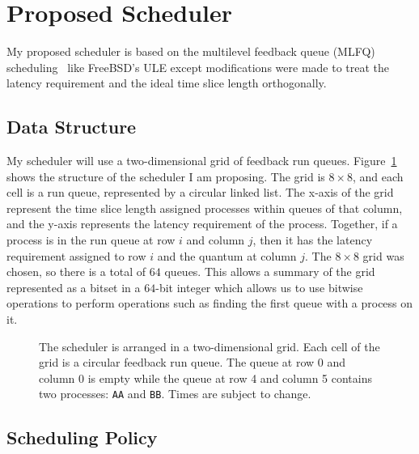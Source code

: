 \documentclass[letterpaper,twocolumn,10pt]{article}
\begin{document}
\section{Proposed Scheduler}

My proposed scheduler is based on the multilevel feedback queue (MLFQ) 
scheduling~\cite{mlfq} like FreeBSD's ULE except modifications were made 
to treat the latency requirement and the ideal time slice length orthogonally.

\subsection{Data Structure}

My scheduler will use a two-dimensional grid of feedback run queues. 
Figure~\ref{fig:mlfq_grid} shows the structure of the scheduler I am proposing. 
The grid is \(8\times 8\), and each cell is a run queue, represented by a 
circular linked list. The x-axis of the grid represent the time slice length 
assigned processes within queues of that column, and the y-axis represents the 
latency requirement of the process. Together, if a process is in the run 
queue at row \(i\) and column \(j\), then it has the latency requirement assigned 
to row \(i\) and the quantum at column \(j\). The \(8\times 8\) grid was chosen, 
so there is a total of \(64\) queues. This allows a summary of the grid represented 
as a bitset in a \(64\)-bit integer which allows us to use bitwise operations to 
perform operations such as finding the first queue with a process on it.  

\begin{figure}
  \begin{center}
    
  \end{center}
  \captionsetup{font=scriptsize}
  \vspace{-10pt}
  \caption{\scriptsize\label{fig:mlfq_grid} The scheduler is arranged in a 
  two-dimensional grid. Each cell of the grid is a circular feedback run queue.
  The queue at row 0 and column 0 is empty while the queue at row 4 and column 
  5 contains two processes: \texttt{AA} and \texttt{BB}. Times are subject
  to change.}
\end{figure}

\subsection{Scheduling Policy}
\end{document}
